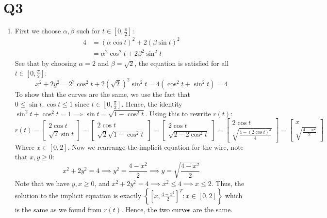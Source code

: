 \documentclass[a4paper, 11pt]{article}
\def\set#1{\left\{ #1 \right\}}
\begin{document}
\pagebreak
\section*{Q3}
\begin{enumerate}[label=(\alph*)]
  \item First we choose $\alpha,\beta$ such for $t\in[0,\frac\pi2]$:
        \begin{align*}
          4 & = (\alpha\cos t)^2 + 2(\beta\sin t)^2  \\
            & = \alpha^2\cos^2 t  + 2\beta^2\sin^2 t
        \end{align*}
        See that by choosing $\alpha=2$ and $\beta=\sqrt 2$, the equation is satisfied for all $t\in[0,\frac\pi 2]$:
        $$x^2+2y^2= 2^2\cos^2t+2(\sqrt 2)^2\sin^2 t=4(\cos^2 t+\sin^2 t)=4
        $$
        To show that the curves are the same, we use the fact that $0\leq \sin t,\cos t\leq 1$ since $t\in[0,\frac\pi2]$. Hence, the identity $\sin^2 t + \cos^2 t = 1 \implies \sin t = \sqrt{1-\cos^2 t}$. Using this to rewrite $r(t)$:
        $$r(t)=\begin{bmatrix}
            2\cos t \\
            \sqrt 2\sin t
          \end{bmatrix}=\begin{bmatrix}
            2\cos t \\
            \sqrt 2\sqrt{1-\cos^2t}
          \end{bmatrix}=\begin{bmatrix}
            2\cos t \\
            \sqrt{2-2\cos^2t}
          \end{bmatrix}=\begin{bmatrix}
            2\cos t \\
            \sqrt{\frac{4-(2\cos t)^2}{4}}
          \end{bmatrix}=\begin{bmatrix}
            x \\
            \sqrt{\frac{4-x^2}2}
          \end{bmatrix}$$
        Where $x\in[0,2]$. Now we rearrange the implicit equation for the wire, note that $x,y\geq 0$:
        $$x^2+2y^2=4 \implies y^2=\frac{4-x^2}{2}\implies y=\sqrt{\frac{4-x^2}2}$$
        Note that we have $y,x\geq 0$, and $x^2+2y^2=4\implies x^2\leq 4\implies x\leq 2$. Thus, the solution to the implicit equation is exactly $\set{[x,\frac{4-x^2}{2}]^T:x\in[0,2]}$ which is the same as we found from $r(t)$. Hence, the two curves are the same.




\end{enumerate}
\end{document}

